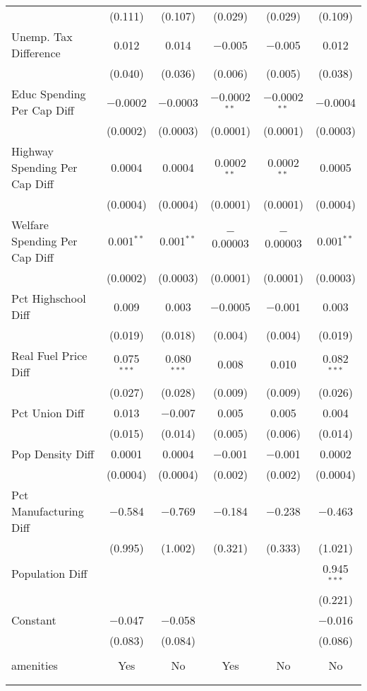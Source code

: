 \begin{table}[!htbp]
\begin{tabular}{@{\extracolsep{5pt}}lccccc}
  & (0.111) & (0.107) & (0.029) & (0.029) & (0.109) \\ 
  Unemp. Tax Difference & 0.012 & 0.014 & $-$0.005 & $-$0.005 & 0.012 \\ 
  & (0.040) & (0.036) & (0.006) & (0.005) & (0.038) \\ 
  Educ Spending Per Cap Diff & $-$0.0002 & $-$0.0003 & $-$0.0002$^{**}$ & $-$0.0002$^{**}$ & $-$0.0004 \\ 
  & (0.0002) & (0.0003) & (0.0001) & (0.0001) & (0.0003) \\ 
  Highway Spending Per Cap Diff & 0.0004 & 0.0004 & 0.0002$^{**}$ & 0.0002$^{**}$ & 0.0005 \\ 
  & (0.0004) & (0.0004) & (0.0001) & (0.0001) & (0.0004) \\ 
  Welfare Spending Per Cap Diff & 0.001$^{**}$ & 0.001$^{**}$ & $-$0.00003 & $-$0.00003 & 0.001$^{**}$ \\ 
  & (0.0002) & (0.0003) & (0.0001) & (0.0001) & (0.0003) \\ 
  Pct Highschool Diff & 0.009 & 0.003 & $-$0.0005 & $-$0.001 & 0.003 \\ 
  & (0.019) & (0.018) & (0.004) & (0.004) & (0.019) \\ 
  Real Fuel Price Diff & 0.075$^{***}$ & 0.080$^{***}$ & 0.008 & 0.010 & 0.082$^{***}$ \\ 
  & (0.027) & (0.028) & (0.009) & (0.009) & (0.026) \\ 
  Pct Union Diff & 0.013 & $-$0.007 & 0.005 & 0.005 & 0.004 \\ 
  & (0.015) & (0.014) & (0.005) & (0.006) & (0.014) \\ 
  Pop Density Diff & 0.0001 & 0.0004 & $-$0.001 & $-$0.001 & 0.0002 \\ 
  & (0.0004) & (0.0004) & (0.002) & (0.002) & (0.0004) \\ 
  Pct Manufacturing Diff & $-$0.584 & $-$0.769 & $-$0.184 & $-$0.238 & $-$0.463 \\ 
  & (0.995) & (1.002) & (0.321) & (0.333) & (1.021) \\ 
  Population Diff &  &  &  &  & 0.945$^{***}$ \\ 
  &  &  &  &  & (0.221) \\ 
  Constant & $-$0.047 & $-$0.058 &  &  & $-$0.016 \\ 
  & (0.083) & (0.084) &  &  & (0.086) \\ 
 \hline \\[-1.8ex] 
amenities & Yes & No & Yes & No & No \\ 
\hline \\[-1.8ex] 
\hline 
\hline \\[-1.8ex] 
\end{tabular} 
\end{table} 
